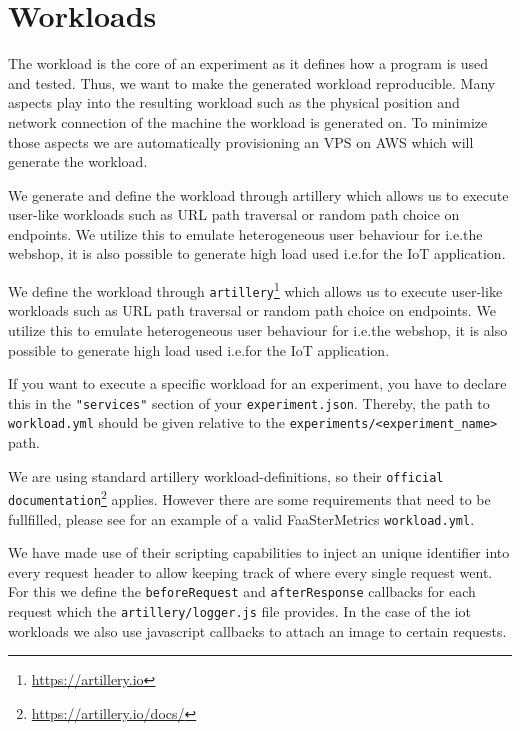 \documentclass[../main.tex]{subfiles}
\begin{document}
\section{Workloads}\label{sec:WorkloadsStructure}

The workload is the core of an experiment as it defines how a program is used and tested. 
Thus, we want to make the generated workload reproducible. 
Many aspects play into the resulting workload such as the physical position and network connection of the machine the workload is generated on. 
To minimize those aspects we are automatically provisioning an VPS on AWS which will generate the workload.

We generate and define the workload through artillery which allows us to execute user-like workloads 
such as URL path traversal or random path choice on endpoints. 
We utilize this to emulate heterogeneous user behaviour for i.e.\@ the webshop, 
it is also possible to generate high load used i.e.\@ for the IoT application.

We define the workload through \texttt{artillery}\footnote{\url{https://artillery.io}} which allows us to 
execute user-like workloads such as URL path traversal or random path choice on endpoints. 
We utilize this to emulate heterogeneous user behaviour for i.e.\@ the webshop, 
it is also possible to generate high load used i.e.\@ for the IoT application.

If you want to execute a specific workload for an experiment, 
you have to declare this in the \texttt{"services"} section of your \texttt{experiment.json}.
Thereby, the path to \texttt{workload.yml} should be given relative to the \texttt{experiments/<experiment\_name>} path. 

We are using standard artillery workload-definitions, 
so their \texttt{official documentation}\footnote{\url{https://artillery.io/docs/}} applies. 
However there are some requirements that need to be fullfilled, 
please see  for an example of a valid FaaSterMetrics \texttt{workload.yml}.

We have made use of their scripting capabilities to inject an unique identifier 
into every request header to allow keeping track of where every single request went. 
For this we define the \texttt{beforeRequest} and \texttt{afterResponse} callbacks for each request 
which the \texttt{artillery/logger.js} file provides.
In the case of the iot workloads we also use javascript callbacks to attach an image to certain requests.
\end{document}
